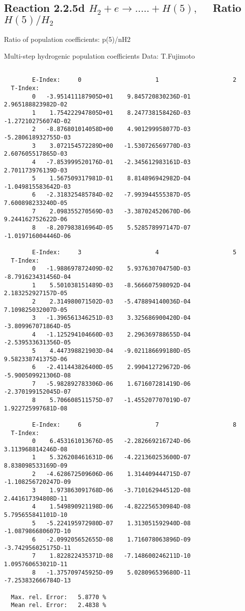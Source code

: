 \subsection{
Reaction 2.2.5d  $H_2 + e \rightarrow .....+H(5)   , \quad $
Ratio $H(5)/H_2 $
}

 Ratio of population coefficients: p(5)/nH2

 Multi-step hydrogenic population coefficients
 Data: T.Fujimoto


\begin{verbatim}

        E-Index:     0                     1                     2
  T-Index:
        0   -3.951411187905D+01    9.845720830236D-01    2.965188823982D-02
        1    1.754222947805D+01    8.247738158426D-03   -1.272102756074D-02
        2   -8.876801014058D+00    4.901299958077D-03   -5.280618932755D-03
        3    3.072154572289D+00   -1.530726569770D-03    2.607605517865D-03
        4   -7.853999520176D-01   -2.345612983161D-03    2.701173976139D-03
        5    1.567509317981D-01    8.814896942982D-04   -1.049815583642D-03
        6   -2.318325485784D-02   -7.993944555387D-05    7.600898233240D-05
        7    2.098355270569D-03   -3.387024520670D-06    9.244162752622D-06
        8   -8.207983816964D-05    5.528578997147D-07   -1.019716004446D-06

        E-Index:     3                     4                     5
  T-Index:
        0   -1.988697872409D-02    5.937630704750D-03   -8.791623431456D-04
        1    5.501038151489D-03   -8.566607598092D-04    2.183252927157D-05
        2    2.314980071502D-03   -5.478894140036D-04    7.109825032007D-05
        3   -1.396561346251D-03    3.325686900420D-04   -3.809967071864D-05
        4   -1.125294104660D-03    2.296369788655D-04   -2.539533631356D-05
        5    4.447398821903D-04   -9.021186699180D-05    9.582338741375D-06
        6   -2.411443826400D-05    2.990412729672D-06   -5.900509921306D-08
        7   -5.982892783306D-06    1.671607281419D-06   -2.370199152045D-07
        8    5.706608511575D-07   -1.455207707019D-07    1.922725997681D-08

        E-Index:     6                     7                     8
  T-Index:
        0    6.453161013676D-05   -2.282669216724D-06    3.113968814246D-08
        1    5.326208461631D-06   -4.221360253600D-07    8.838098533169D-09
        2   -4.628672509606D-06    1.314409444715D-07   -1.108256720247D-09
        3    1.973863091768D-06   -3.710162944512D-08    2.441617394808D-11
        4    1.549890921198D-06   -4.822256530984D-08    5.795655841101D-10
        5   -5.224195972980D-07    1.313051592940D-08   -1.087986680607D-10
        6   -2.099205652655D-08    1.716078063896D-09   -3.742956025175D-11
        7    1.822822435371D-08   -7.148600246211D-10    1.095760653021D-11
        8   -1.375709745925D-09    5.028096539680D-11   -7.253832666784D-13

  Max. rel. Error:   5.8770 %
  Mean rel. Error:   2.4838 %



\end{verbatim}
